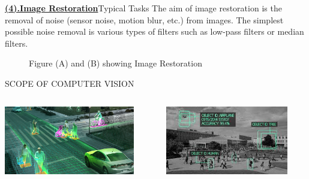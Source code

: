 \documentclass{beamer}
\begin{document}
{\begin{frame}{\textbf{\underline{(4).Image Restoration}}}{Typical Tasks}\pause
The aim of image restoration is the removal of noise (sensor noise, motion blur, etc.) from images. The simplest possible noise removal is various types of filters such as low-pass filters or median filters.\pause
\begin{figure}
\centering
{}\qquad \pause
{}
\caption{Figure (A) and (B) showing Image Restoration}
\label{fig:1}
\end{figure}
\end{frame}

\begin{frame}{SCOPE OF COMPUTER VISION}

\begin{columns}[T]
	\begin{column}[T]{5cm}
		\includegraphics[height=3cm]{research-home-areas-computer-vision-407-ud@2X.jpg}
	\end{column}
	\begin{column}[T]{5cm}
		\includegraphics[height=3cm]{download.jpg}
	\end{column}
\end{columns}
\end{frame}
}
\end{document}
